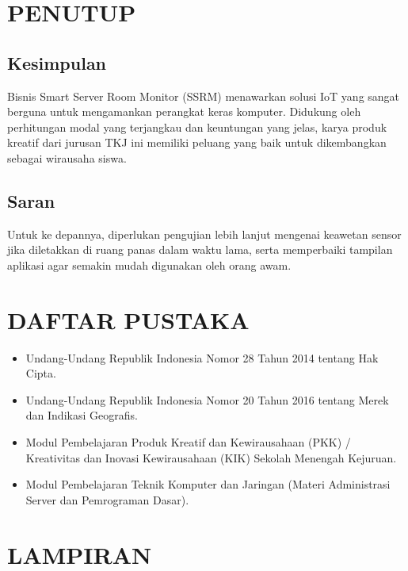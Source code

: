 \documentclass[12pt, a4paper]{article}
\begin{document}
\section{PENUTUP}

\subsection{Kesimpulan}
Bisnis Smart Server Room Monitor (SSRM) menawarkan solusi IoT yang sangat berguna untuk mengamankan perangkat keras komputer. Didukung oleh perhitungan modal yang terjangkau dan keuntungan yang jelas, karya produk kreatif dari jurusan TKJ ini memiliki peluang yang baik untuk dikembangkan sebagai wirausaha siswa.

\subsection{Saran}
Untuk ke depannya, diperlukan pengujian lebih lanjut mengenai keawetan sensor jika diletakkan di ruang panas dalam waktu lama, serta memperbaiki tampilan aplikasi agar semakin mudah digunakan oleh orang awam.

\newpage

\section*{DAFTAR PUSTAKA}

\begin{itemize}
    \item Undang-Undang Republik Indonesia Nomor 28 Tahun 2014 tentang Hak Cipta.
    \item Undang-Undang Republik Indonesia Nomor 20 Tahun 2016 tentang Merek dan Indikasi Geografis.
    \item Modul Pembelajaran Produk Kreatif dan Kewirausahaan (PKK) / Kreativitas dan Inovasi Kewirausahaan (KIK) Sekolah Menengah Kejuruan.
    \item Modul Pembelajaran Teknik Komputer dan Jaringan (Materi Administrasi Server dan Pemrograman Dasar).
\end{itemize}

\newpage

\section*{LAMPIRAN}
\end{document}
